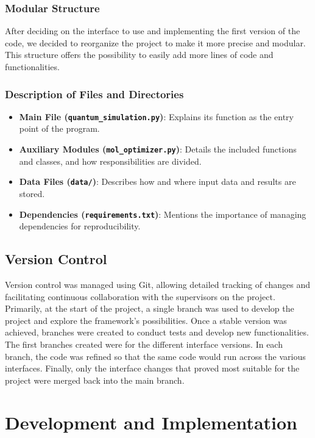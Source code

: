 \subsubsection{Modular Structure}
After deciding on the interface to use and implementing the first version of the code, we decided to reorganize the project to make it more precise and modular. This structure offers the possibility to easily add more lines of code and functionalities.

\subsubsection{Description of Files and Directories}

\begin{itemize}
    \item \textbf{Main File (\texttt{quantum\_simulation.py})}: Explains its function as the entry point of the program.
    \item \textbf{Auxiliary Modules (\texttt{mol\_optimizer.py})}: Details the included functions and classes, and how responsibilities are divided.
    \item \textbf{Data Files (\texttt{data/})}: Describes how and where input data and results are stored.
    \item \textbf{Dependencies (\texttt{requirements.txt})}: Mentions the importance of managing dependencies for reproducibility.
\end{itemize}


\subsection{Version Control}

Version control was managed using Git, allowing detailed tracking of changes and facilitating continuous collaboration with the supervisors on the project. Primarily, at the start of the project, a single branch was used to develop the project and explore the framework's possibilities. Once a stable version was achieved, branches were created to conduct tests and develop new functionalities. The first branches created were for the different interface versions. In each branch, the code was refined so that the same code would run across the various interfaces. Finally, only the interface changes that proved most suitable for the project were merged back into the main branch.

\section{Development and Implementation}

